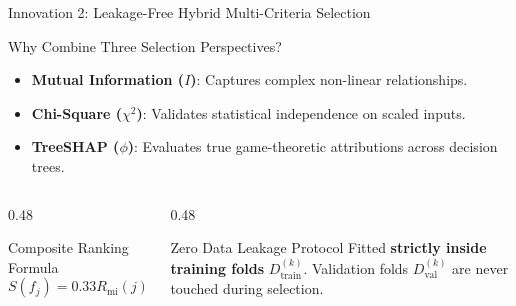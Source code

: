 \documentclass[aspectratio=169,10pt]{beamer}
\begin{document}
\begin{frame}{Innovation 2: Leakage-Free Hybrid Multi-Criteria Selection}
    \begin{block}{Why Combine Three Selection Perspectives?}
        \begin{itemize}
            \item \textbf{Mutual Information ($I$)}: Captures complex non-linear relationships.
            \item \textbf{Chi-Square ($\chi^2$)}: Validates statistical independence on scaled inputs.
            \item \textbf{TreeSHAP ($\phi$)}: Evaluates true game-theoretic attributions across decision trees.
        \end{itemize}
    \end{block}
    
    \begin{columns}[T]
        \begin{column}{0.48\textwidth}
            \begin{exampleblock}{Composite Ranking Formula}
                $$S(f_j) = 0.33 R_{\text{mi}}(j) + 0.33 R_{\chi^2}(j) + 0.34 R_{\text{shap}}(j)$$
            \end{exampleblock}
        \end{column}
        \begin{column}{0.48\textwidth}
            \begin{alertblock}{Zero Data Leakage Protocol}
                Fitted \textbf{strictly inside training folds} $D_{\text{train}}^{(k)}$. Validation folds $D_{\text{val}}^{(k)}$ are never touched during selection.
            \end{alertblock}
        \end{column}
    \end{columns}
\end{frame}
\end{document}
